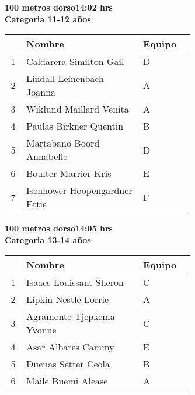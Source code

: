 \begin{minipage}{0.95\linewidth}\vspace{0.5cm} 
\begin{flushleft}
\textbf{
\hspace{-0.15cm}100 metros dorso\hspace{1.5cm}14:02 hrs \\Categoria 11-12 años}\vspace{-0.2cm} 
\end{flushleft}
\begin{tabular}{cp{0.63\linewidth}l}
\hline
& \textbf{Nombre} & \textbf{Equipo} \\ \hline
1 & Caldarera Similton Gail & D \\ 
2 & Lindall Leinenbach Joanna & A \\ 
3 & Wiklund Maillard Venita & A \\ 
4 & Paulas Birkner Quentin & B \\ 
5 & Martabano Boord Annabelle & D \\ 
6 & Boulter Marrier Kris & E \\ 
7 & Isenhower Hoopengardner Ettie & F \\ 
\end{tabular}
\end{minipage}
\begin{minipage}{0.95\linewidth}\vspace{0.5cm} 
\begin{flushleft}
\textbf{
\hspace{-0.15cm}100 metros dorso\hspace{1.5cm}14:05 hrs \\Categoria 13-14 años}\vspace{-0.2cm} 
\end{flushleft}
\begin{tabular}{cp{0.63\linewidth}l}
\hline
& \textbf{Nombre} & \textbf{Equipo} \\ \hline
1 & Isaacs Louissant Sheron & C \\ 
2 & Lipkin Nestle Lorrie & A \\ 
3 & Agramonte Tjepkema Yvonne & C \\ 
4 & Asar Albares Cammy & E \\ 
5 & Duenas Setter Ceola & B \\ 
6 & Maile Buemi Alease & A \\ 
\end{tabular}
\end{minipage}
